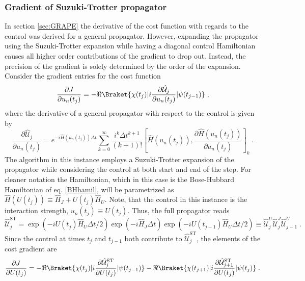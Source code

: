 \subsubsection{Gradient of Suzuki-Trotter propagator}
In section \ref{sec:GRAPE} the derivative of the cost function with regards to the control was derived for a general propagator. However, expanding the propagator using the Suzuki-Trotter expansion while having a diagonal control Hamiltonian causes all higher order contributions of the gradient to drop out. Instead, the precision of the gradient is solely determined by the order of the expansion.\\
Consider the gradient entries for the cost function
\begin{equation}
	\frac{\partial J}{\partial u_n (t_j)} = - \Re \Braket{\chi (t_j) | i \frac{ \partial \hat{\mathcal{U}}_{j}}{\partial u_n (t_j)} | \psi (t_{j-1})} \; ,
\end{equation}
where the derivative of a general propagator with respect to the control is given by
\begin{equation}
	\frac{\partial \hat{\mathcal{U}}_{j}}{\partial u_n (t_j)} = e^{-i \hat{H} (u_n (t_j)) \Delta t}  \sum_{k = 0}^{\infty }  \frac{i^k \Delta t^{k+1}}{(k+1)!} \left[ \hat{H} (u_n (t_j)) , \frac{\partial \hat{H} (u_n (t_j))}{\partial u_n (t_j)}  \right]_k \;.
\end{equation}
The algorithm in this instance employs a Suzuki-Trotter expansion of the propagator while considering the control at both start and end of the step. For cleaner notation the Hamiltonian, which in this case is the Bose-Hubbard Hamiltonian of eq. \eqref{BHhamil}, will be parametrized as $\hat{H}(U(t_j)) \equiv \hat{H}_J + U(t_j) \hat{H}_U$. Note, that the control in this instance is the interaction strength, $u_n (t_j) \equiv U (t_j)$. Thus, the full propagator reads
\begin{equation}
	\hat{\mathcal{U}}_{j}^{\mathrm{ST}} = \exp \left( -i U(t_j) \hat{H}_U \Delta t /2 \right) \exp \left( -i \hat{H}_J \Delta t \right) \exp \left( -i  U(t_{j-1}) \hat{H}_U  \Delta t /2 \right)  \equiv \hat{\mathcal{U}}_{j}^{U} \hat{\mathcal{U}}_{j}^{J} \hat{\mathcal{U}}_{j-1}^{U} \; .
\end{equation}
Since the control at times $t_j$ and $t_{j-1}$ both contribute to $\hat{\mathcal{U}}_{j}^{\mathrm{ST}}$, the elements of the cost gradient are
\begin{equation}
	\frac{\partial J}{\partial U (t_j)} = - \Re \Braket{\chi (t_j) | i  \frac{\partial \hat{\mathcal{U}}_{j}^{\mathrm{ST}}}{\partial U (t_j)} | \psi (t_{j-1})} - \Re \Braket{\chi (t_{j+1}) | i \frac{ \partial \hat{\mathcal{U}}_{j+1}^{\mathrm{ST}}}{\partial U (t_j)} | \psi (t_{j})} \; . \label{eq:STcostderiv}
\end{equation}
